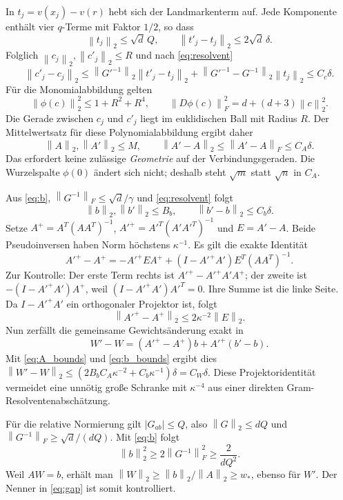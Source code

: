 \documentclass[11pt,a4paper]{article}
\theoremstyle{definition}\newtheorem{definition}{Definition}
\theoremstyle{remark}\newtheorem*{remark}{Bemerkung}
\newcommand{\norm}[1]{\left\lVert#1\right\rVert}
\begin{document}
In $t_j=v(x_j)-v(r)$ hebt sich der Landmarkenterm auf. Jede Komponente enthält vier $q$-Terme mit Faktor $1/2$, so dass
\[
 \norm{t_j}_2\leq\sqrt d\,Q,
 \qquad\norm{t'_j-t_j}_2\leq2\sqrt d\,\delta.
\]
Folglich $\norm{c_j}_2,\norm{c'_j}_2\leq R$ und nach \eqref{eq:resolvent}
\[
 \norm{c'_j-c_j}_2
 \leq\norm{G'^{-1}}_2\norm{t'_j-t_j}_2
       +\norm{G'^{-1}-G^{-1}}_2\norm{t_j}_2
 \leq C_c\delta.
\]
Für die Monomialabbildung gelten
\[
 \norm{\phi(c)}_2^2\leq1+R^2+R^4,
 \qquad\norm{D\phi(c)}_F^2=d+(d+3)\norm{c}_2^2.
\]
Die Gerade zwischen $c_j$ und $c'_j$ liegt im euklidischen Ball mit Radius $R$. Der Mittelwertsatz für diese Polynomialabbildung ergibt daher
\begin{equation}\label{eq:A_bounds}
 \norm{A}_2,\norm{A'}_2\leq M,\qquad
 \norm{A'-A}_2\leq\norm{A'-A}_F\leq C_A\delta.
\end{equation}
Das erfordert keine zulässige \emph{Geometrie} auf der Verbindungsgeraden. Die Wurzelspalte $\phi(0)$ ändert sich nicht; deshalb steht $\sqrt m$ statt $\sqrt n$ in $C_A$.

Aus \eqref{eq:b}, $\norm{G^{-1}}_F\leq\sqrt d/\gamma$ und \eqref{eq:resolvent} folgt
\begin{equation}\label{eq:b_bounds}
 \norm{b}_2,\norm{b'}_2\leq B_b,\qquad
 \norm{b'-b}_2\leq C_b\delta.
\end{equation}
Setze $A^+=A^T(AA^T)^{-1}$, $A'^+=A'^T(A'A'^T)^{-1}$ und $E=A'-A$.
Beide Pseudoinversen haben Norm höchstens $\kappa^{-1}$. Es gilt die exakte Identität
\begin{equation}\label{eq:pseudoidentity}
 A'^+-A^+=-A'^+EA^+
       +(I-A'^+A')E^T(AA^T)^{-1}.
\end{equation}
Zur Kontrolle: Der erste Term rechts ist $A'^+-A'^+A'A^+$; der zweite ist $-(I-A'^+A')A^+$, weil $(I-A'^+A')A'^T=0$. Ihre Summe ist die linke Seite. Da $I-A'^+A'$ ein orthogonaler Projektor ist, folgt
\[
 \norm{A'^+-A^+}_2\leq2\kappa^{-2}\norm E_2.
\]
Nun zerfällt die gemeinsame Gewichtsänderung exakt in
\[
 W'-W=(A'^+-A^+)b+A'^+(b'-b).
\]
Mit \eqref{eq:A_bounds} und \eqref{eq:b_bounds} ergibt dies
$\norm{W'-W}_2\leq(2B_bC_A\kappa^{-2}+C_b\kappa^{-1})\delta=C_W\delta$.
Diese Projektoridentität vermeidet eine unnötig große Schranke mit $\kappa^{-4}$ aus einer direkten Gram-Resolventenabschätzung.

Für die relative Normierung gilt $|G_{ab}|\leq Q$, also $\norm G_2\leq dQ$ und $\norm{G^{-1}}_F\geq\sqrt d/(dQ)$. Mit \eqref{eq:b} folgt
\[
 \norm b_2^2\geq2\norm{G^{-1}}_F^2\geq\frac{2}{dQ^2}.
\]
Weil $AW=b$, erhält man $\norm W_2\geq\norm b_2/\norm A_2\geq w_*$, ebenso für $W'$. Der Nenner in \eqref{eq:gap} ist somit kontrolliert.
\end{document}
